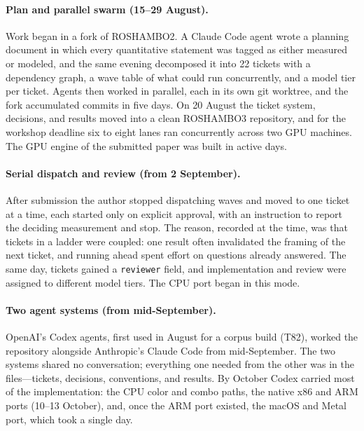 \paragraph{Plan and parallel swarm (15--29 August).} Work began in a fork of
ROSHAMBO2. A Claude Code agent wrote a planning document in which every
quantitative statement was tagged as either measured or modeled, and the same
evening decomposed it into 22 tickets with a dependency graph, a wave table of
what could run concurrently, and a model tier per ticket. Agents then worked in
parallel, each in its own git worktree, and the fork accumulated
\OriginCommitCount{} commits in five days. On 20 August the ticket system,
decisions, and results moved into a clean ROSHAMBO3 repository, and for the
workshop deadline six to eight lanes ran concurrently across two GPU machines.
The GPU engine of the submitted paper was built in \AugustActiveDays{} active
days.

\paragraph{Serial dispatch and review (from 2 September).} After submission the
author stopped dispatching waves and moved to one ticket at a time, each
started only on explicit approval, with an instruction to report the deciding
measurement and stop. The reason, recorded at the time, was that tickets in a
ladder were coupled: one result often invalidated the framing of the next
ticket, and running ahead spent effort on questions already answered. The same
day, tickets gained a \texttt{reviewer} field, and implementation and review
were assigned to different model tiers. The CPU port began in this mode.

\paragraph{Two agent systems (from mid-September).} OpenAI's Codex agents, first
used in August for a corpus build (T82), worked the repository alongside
Anthropic's Claude Code from mid-September. The two systems shared no
conversation; everything one needed from the other was in the files---tickets,
decisions, conventions, and results. By October Codex carried most of the
implementation: the CPU color and combo paths, the native x86 and ARM ports
(10--13 October), and, once the ARM port existed, the macOS and Metal port,
which took a single day.

